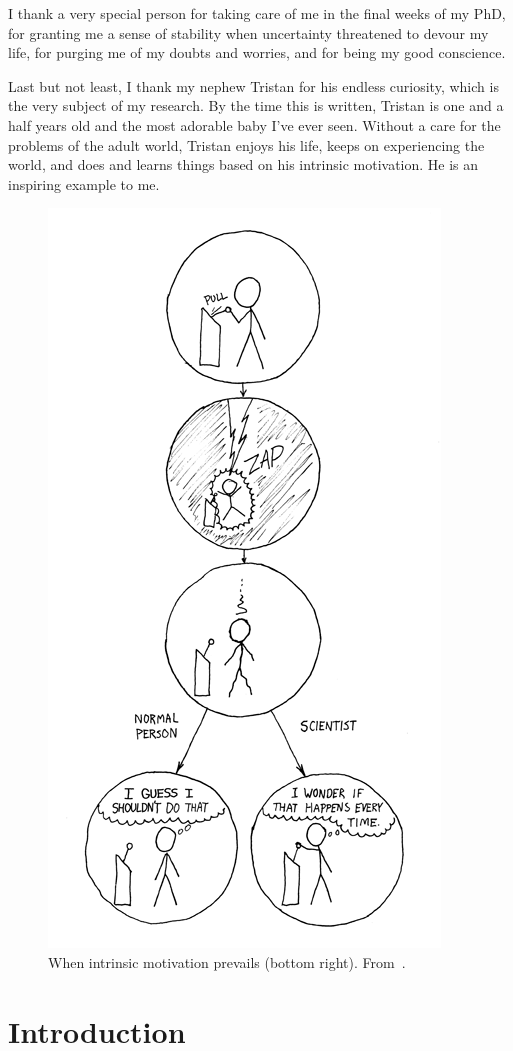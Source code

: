 \documentclass[a4paper]{scrreprt}
\begin{document}
I thank a very special person for taking care of me in the final weeks of my PhD, for granting me a sense of stability when uncertainty threatened to devour my life, for purging me of my doubts and worries, and for being my good conscience.

Last but not least, I thank my nephew Tristan for his endless curiosity, which is the very subject of my research. By the time this is written, Tristan is one and a half years old and the most adorable baby I've ever seen. Without a care for the problems of the adult world, Tristan enjoys his life, keeps on experiencing the world, and does and learns things based on his intrinsic motivation. He is an inspiring example to me.


\newpage


\begin{figure}
\centering
\includegraphics[width=0.5\linewidth]{figs/the_difference.png}
\caption*{When intrinsic motivation prevails (bottom right). From~\cite{xkcd}.}
\end{figure}

\clearpage





\chapter{Introduction}
\label{ch:intro}
\end{document}
